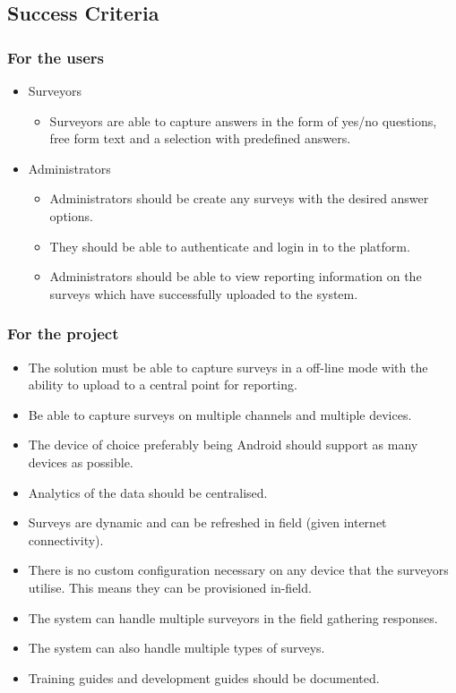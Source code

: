 \documentclass[12pt]{witseiepaper}
\begin{document}
\subsection{Success Criteria}
\subsubsection{For the users}
\begin{itemize}
  \item Surveyors \begin{itemize}
  \item Surveyors are able to capture answers in the form of yes/no questions, free form text and a selection with predefined answers.
  \end{itemize}
    \item Administrators \begin{itemize}
  \item Administrators should be create any surveys with the desired answer options.
  \item They should be able to authenticate and login in to the platform.
  \item Administrators should be able to view reporting information on the surveys which have successfully uploaded to the system.
  \end{itemize}

\end{itemize}

\subsubsection{For the project}
\begin{itemize}
  \item The solution must be able to capture surveys in a off-line mode with the ability to upload to a central point for reporting.
  \item Be able to capture surveys on multiple channels and multiple devices.
  \item The device of choice preferably being Android should support as many devices as possible.
  \item Analytics of the data should be centralised.
  \item Surveys are dynamic and can be refreshed in field (given internet connectivity).
  \item There is no custom configuration necessary on any device that the surveyors utilise. This means they can be provisioned in-field.
  \item The system can handle multiple surveyors in the field gathering responses.
  \item The system can also handle multiple types of surveys.
  \item Training guides and development guides should be documented.
\end{itemize}
\end{document}
